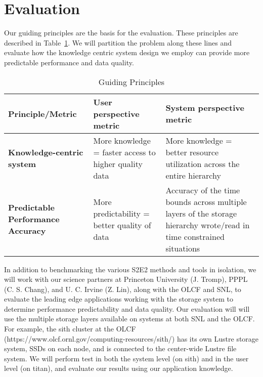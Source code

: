 \section{Evaluation}
\label{sec:evaluation}

Our guiding principles are the basis for the evaluation. These principles are
described in Table~\ref{table:eval}.  We will partition the problem along these
lines and evaluate how the knowledge centric system design we employ can
provide more predictable performance and data quality. 

\begin{table}[ht]
\caption{Guiding Principles}
\label{table:eval}
\centering
\begin{tabular}{ | p{1.4in} | p{2in} | p{2.5in} | }
  \hline
  {\bf Principle/Metric}                   & {\bf User perspective metric}   & {\bf System perspective metric }\\ \hline
  {\bf Knowledge-centric system}           & More knowledge = faster access to higher quality data &  More knowledge = better resource utilization across the entire hierarchy \\ \hline
  {\bf Predictable Performance Accuracy}   & More predictability = better quality of data &  Accuracy of the time bounds across multiple layers of the storage hierarchy wrote/read in time constrained situations\\ \hline
\end{tabular}
\end{table}

In addition to benchmarking the various S2E2 methods and tools in isolation,
we will work with our science partners at Princeton University (J. Tromp),
PPPL (C. S. Chang), and U. C. Irvine (Z. Lin), along with the OLCF and SNL,
to evaluate the leading edge applications working with the storage system to
determine performance predictability and data quality.  Our evaluation will
will use the multiple storage layers available on systems at both SNL and the
OLCF.  For example, the sith cluster at the OLCF
(https://www.olcf.ornl.gov/computing-resources/sith/) has its own Lustre
storage system, SSDs on each node, and is connected to the center-wide Lustre
file system. We will perform test in both the system level (on sith) and in
the user level (on titan), and evaluate our results using our application
knowledge.


